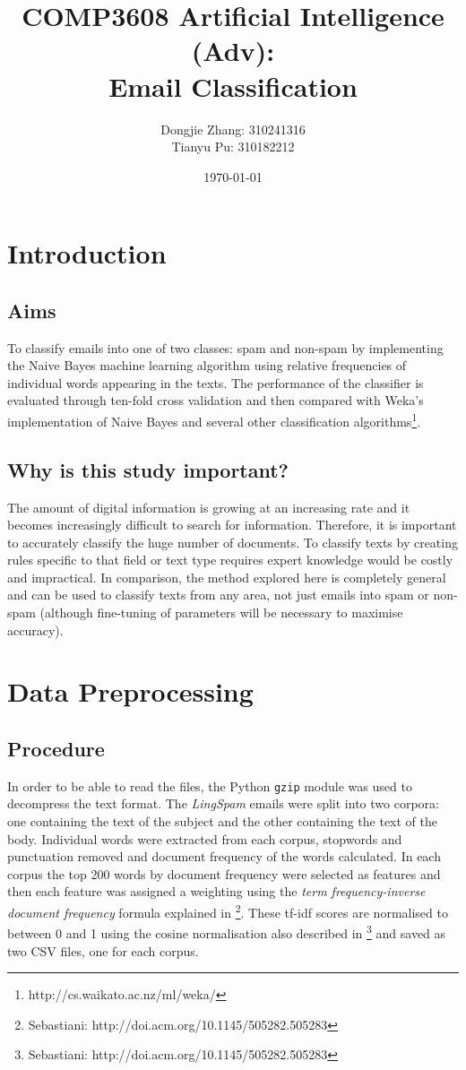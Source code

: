 \documentclass[12pt]{article}
\title{COMP3608 Artificial Intelligence (Adv): \\
Email Classification}
\author{Dongjie Zhang: 310241316 
\\ Tianyu Pu: 310182212}
\date{\today}
\begin{document}
\maketitle

\section{Introduction}
\subsection{Aims}
To classify emails into one of two classes: spam and non-spam by implementing the 
Naive Bayes machine learning algorithm using relative frequencies of individual 
words appearing in the texts. The performance of the classifier is evaluated through 
ten-fold cross validation and then compared with Weka's implementation of Naive Bayes 
and several other classification algorithms\footnote{http://cs.waikato.ac.nz/ml/weka/}.

\subsection{Why is this study important?}
The amount of digital information is growing at an increasing rate and it becomes 
increasingly difficult to search for information. Therefore, it is important to 
accurately classify the huge number of documents. To classify texts by creating 
rules specific to that field or text type requires expert knowledge would be costly 
and impractical. In comparison, the method explored here is completely general and 
can be used to classify texts from any area, not just emails into spam or non-spam 
(although fine-tuning of parameters will be necessary to maximise accuracy).

\section{Data Preprocessing}
\subsection{Procedure}
In order to be able to read the files, the Python \verb=gzip= module was used to
decompress the text format.
The \emph{LingSpam} emails were split into two corpora: one containing the text of the 
subject and the other containing the text of the body. Individual words were extracted 
from each corpus, stopwords and punctuation removed and document frequency of 
the words calculated. In each corpus the top 200 words by document frequency were 
selected as features and then each feature was assigned a weighting using the
\emph{term frequency-inverse document frequency} formula explained in \footnote{Sebastiani: http://doi.acm.org/10.1145/505282.505283}.
These tf-idf scores are normalised to between 0 and 1 using the cosine normalisation
also described in \footnote{Sebastiani: http://doi.acm.org/10.1145/505282.505283} and saved as two CSV files, one for each corpus.
\end{document}
